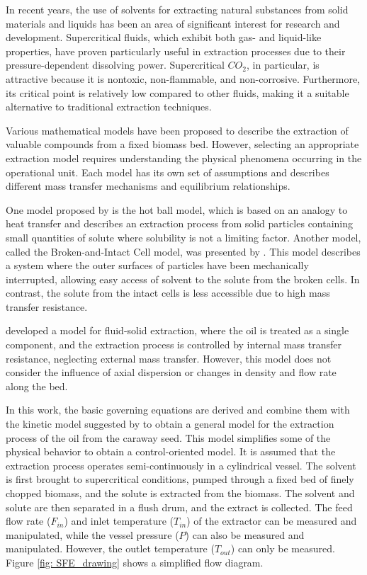 \documentclass[../Article_Model_Parameters.tex]{subfiles}
\begin{document}
	
	In recent years, the use of solvents for extracting natural substances from solid materials and liquids has been an area of significant interest for research and development. Supercritical fluids, which exhibit both gas- and liquid-like properties, have proven particularly useful in extraction processes due to their pressure-dependent dissolving power. Supercritical $CO_2$, in particular, is attractive because it is nontoxic, non-flammable, and non-corrosive. Furthermore, its critical point is relatively low compared to other fluids, making it a suitable alternative to traditional extraction techniques.
	
	Various mathematical models have been proposed to describe the extraction of valuable compounds from a fixed biomass bed. However, selecting an appropriate extraction model requires understanding the physical phenomena occurring in the operational unit. Each model has its own set of assumptions and describes different mass transfer mechanisms and equilibrium relationships.
	
	One model proposed by \citet{Reverchon1993} is the hot ball model, which is based on an analogy to heat transfer and describes an extraction process from solid particles containing small quantities of solute where solubility is not a limiting factor. Another model, called the Broken-and-Intact Cell model, was presented by \citet{Sovova1994}. This model describes a system where the outer surfaces of particles have been mechanically interrupted, allowing easy access of solvent to the solute from the broken cells. In contrast, the solute from the intact cells is less accessible due to high mass transfer resistance.
	
	\citet{Reverchon1996} developed a model for fluid-solid extraction, where the oil is treated as a single component, and the extraction process is controlled by internal mass transfer resistance, neglecting external mass transfer. However, this model does not consider the influence of axial dispersion or changes in density and flow rate along the bed.
	
	In this work, the basic governing equations are derived and combine them with the kinetic model suggested by \citet{Reverchon1996} to obtain a general model for the extraction process of the oil from the caraway seed. This model simplifies some of the physical behavior to obtain a control-oriented model. It is assumed that the extraction process operates semi-continuously in a cylindrical vessel. The solvent is first brought to supercritical conditions, pumped through a fixed bed of finely chopped biomass, and the solute is extracted from the biomass. The solvent and solute are then separated in a flush drum, and the extract is collected. The feed flow rate ($F_{in}$) and inlet temperature ($T_{in}$) of the extractor can be measured and manipulated, while the vessel pressure ($P$) can also be measured and manipulated. However, the outlet temperature ($T_{out}$) can only be measured. Figure \ref{fig: SFE_drawing} shows a simplified flow diagram.
	
\end{document}

